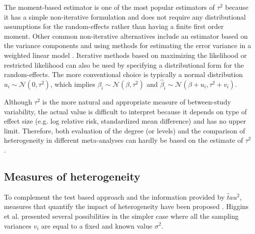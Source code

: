 \documentclass[11pt,a4paper,twoside,openany]{book}\usepackage{knitr}
\begin{document}
{\noindent The moment-based estimator is one of the most popular estimators of $\tau^2$ because it has a simple non-iterative formulation and does not require any distributional assumptions for the random-effects rather than having a finite first order moment. Other common non-iterative alternatives include an estimator based on the variance components \citep{hedges1983random} and using methods for estimating the error variance in a weighted linear model \citep{sidik2005simple}. Iterative methods based on maximizing the likelihood or restricted likelihood can also be used by specifying a distributional form for the random-effects. The more conventional choice is typically a normal distribution $u_i \sim \mathcal{N}\left( 0, \tau^2 \right)$, which implies $\beta_i \sim \mathcal{N}\left(\beta, \tau^2 \right)$ and $\hat \beta_i \sim \mathcal{N}\left(\beta + u_i, \tau^2 + v_i \right)$.

Although $\tau^2$ is the more natural and appropriate measure of between-study variability, the actual value is difficult to interpret because it depends on type of effect size (e.g. log relative risk, standardized mean difference) and has no upper limit. Therefore, both evaluation of the degree (or levels) and the comparison of heterogeneity in different meta-analyses can hardly be based on the estimate of $\tau^2$.


\subsection{Measures of heterogeneity}

To complement the test based approach and the information provided by $\hat tau^2$, measures that quantify the impact of heterogeneity have been proposed \citep{higgins2002quantifying}. 
Higgins et al. presented several possibilities in the simpler case where all the sampling variances $v_i$ are equal to a fixed and known value $\sigma^2$. 

}
\end{document}
